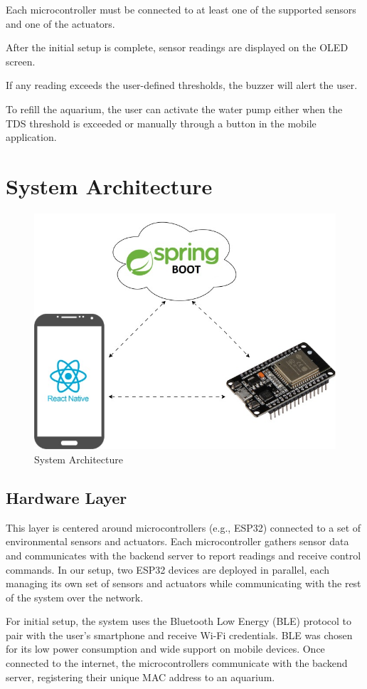 \documentclass[11pt,a4paper]{article}
\begin{document}
Each microcontroller must be connected to at least one of the supported sensors and one of the actuators.

After the initial setup is complete, sensor readings are displayed on the OLED screen.

If any reading exceeds the user-defined thresholds, the buzzer will alert the user.

To refill the aquarium, the user can activate the water pump either when the TDS threshold is exceeded or manually through a button in the mobile application.

\section{System Architecture}

\begin{figure}[H]
  \centering
  \includegraphics[width=0.5\columnwidth]{Images/Layout.jpg}
  \setlength{\belowcaptionskip}{0pt}
  \caption{System Architecture}
  \label{fig:components}
\end{figure}

\subsection{Hardware Layer}

This layer is centered around microcontrollers (e.g., ESP32) connected to a set of environmental sensors and actuators. Each microcontroller gathers sensor data and communicates with the backend server to report readings and receive control commands.
In our setup, two ESP32 devices are deployed in parallel, each managing its own set of sensors and actuators while communicating with the rest of the system over the network.

For initial setup, the system uses the Bluetooth Low Energy (BLE) protocol to pair with the user's smartphone and receive Wi-Fi credentials. BLE was chosen for its low power consumption and wide support on mobile devices. Once connected to the internet, the microcontrollers communicate with the backend server, registering their unique MAC address to an aquarium.
\end{document}
